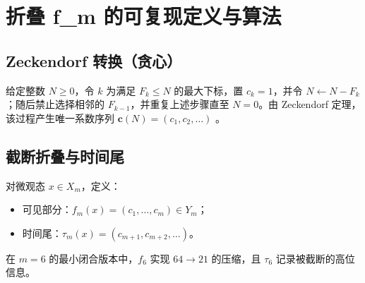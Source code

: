 
\section{折叠 f\_m 的可复现定义与算法}
\label{app:fold}

\subsection{Zeckendorf 转换（贪心）}

给定整数 $N\ge 0$，令 $k$ 为满足 $F_k\le N$ 的最大下标，置 $c_k=1$，并令 $N\leftarrow N-F_k$；随后禁止选择相邻的 $F_{k-1}$，并重复上述步骤直至 $N=0$。由 Zeckendorf 定理，该过程产生唯一系数序列 $\mathbf{c}(N)=(c_1,c_2,\dots)$ \cite{zeckendorf1972representation}。

\subsection{截断折叠与时间尾}

对微观态 $x\in X_m$，定义：
\begin{itemize}
  \item 可见部分：$f_m(x)=(c_1,\dots,c_m)\in Y_m$；
  \item 时间尾：$\tau_m(x)=(c_{m+1},c_{m+2},\dots)$。
\end{itemize}
在 $m=6$ 的最小闭合版本中，$f_6$ 实现 $64\to 21$ 的压缩，且 $\tau_6$ 记录被截断的高位信息。

